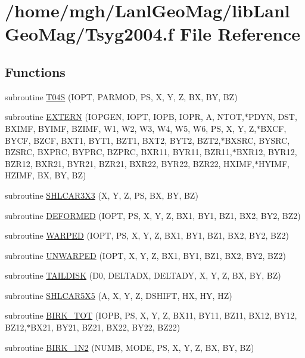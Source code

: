 \hypertarget{_tsyg2004_8f}{
\section{/home/mgh/LanlGeoMag/libLanlGeoMag/Tsyg2004.f File Reference}
\label{_tsyg2004_8f}
}
\subsection*{Functions}
\begin{CompactItemize}
\item 
subroutine \hyperlink{_tsyg2004_8f_76115f6519bc65ea6c916f3272219d4a}{T04S} (IOPT, PARMOD, PS, X, Y, Z, BX, BY, BZ)
\item 
subroutine \hyperlink{_tsyg2004_8f_f4e6ad8b8fa3f74e2914723b740c130c}{EXTERN} (IOPGEN, IOPT, IOPB, IOPR, A, NTOT,$\ast$PDYN, DST, BXIMF, BYIMF, BZIMF, W1, W2, W3, W4, W5, W6, PS, X, Y, Z,$\ast$BXCF, BYCF, BZCF, BXT1, BYT1, BZT1, BXT2, BYT2, BZT2,$\ast$BXSRC, BYSRC, BZSRC, BXPRC, BYPRC, BZPRC, BXR11, BYR11, BZR11,$\ast$BXR12, BYR12, BZR12, BXR21, BYR21, BZR21, BXR22, BYR22, BZR22, HXIMF,$\ast$HYIMF, HZIMF, BX, BY, BZ)
\item 
subroutine \hyperlink{_tsyg2004_8f_d52c74fa97a8f0a23954d670e0e0b84a}{SHLCAR3X3} (X, Y, Z, PS, BX, BY, BZ)
\item 
subroutine \hyperlink{_tsyg2004_8f_62fcead2ce484cd76fdc162bd2e72ca3}{DEFORMED} (IOPT, PS, X, Y, Z, BX1, BY1, BZ1, BX2, BY2, BZ2)
\item 
subroutine \hyperlink{_tsyg2004_8f_25094ad80471178e624b89c840009cc6}{WARPED} (IOPT, PS, X, Y, Z, BX1, BY1, BZ1, BX2, BY2, BZ2)
\item 
subroutine \hyperlink{_tsyg2004_8f_08d1be0e49f67539068d7f8dd74b4b9e}{UNWARPED} (IOPT, X, Y, Z, BX1, BY1, BZ1, BX2, BY2, BZ2)
\item 
subroutine \hyperlink{_tsyg2004_8f_23e0bc0f4d505d14f49527e132c8d7e3}{TAILDISK} (D0, DELTADX, DELTADY, X, Y, Z, BX, BY, BZ)
\item 
subroutine \hyperlink{_tsyg2004_8f_46ca699b5ea2961face078efbaa5da64}{SHLCAR5X5} (A, X, Y, Z, DSHIFT, HX, HY, HZ)
\item 
subroutine \hyperlink{_tsyg2004_8f_eb6fb8bb0214fdedda1df2ef2336c3fe}{BIRK\_\-TOT} (IOPB, PS, X, Y, Z, BX11, BY11, BZ11, BX12, BY12, BZ12,$\ast$BX21, BY21, BZ21, BX22, BY22, BZ22)
\item 
subroutine \hyperlink{_tsyg2004_8f_a74cccacc3c5e631324e705627f8ef28}{BIRK\_\-1N2} (NUMB, MODE, PS, X, Y, Z, BX, BY, BZ)

\end{CompactItemize}
